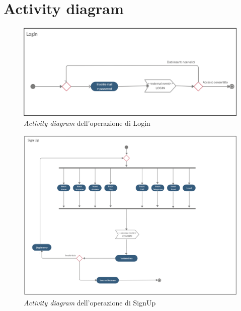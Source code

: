 \documentclass[a4paper,12pt,titlepage]{article}
\begin{document}
{{{\section{Activity diagram}\label{sec:activitydiagram}
\begin{figure}[H]
		\centering
		\includegraphics[scale=0.45, angle=90]{activityDiagramLogin}
		\caption{\textit{Activity diagram} dell'operazione di Login}
\end{figure}
\begin{figure}[H]
		\centering
		\includegraphics[scale=0.34, angle=90]{activityDiagramSignUp}
		\caption{\textit{Activity diagram} dell'operazione di SignUp}
\end{figure}
\begin{figure}[H]
		\centering

\end{figure}}}}
\end{document}
